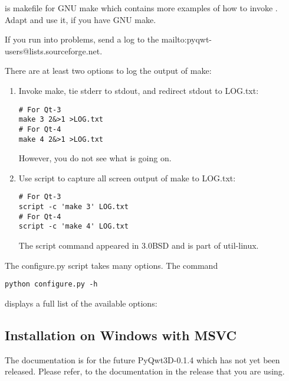 \documentclass{manual}
\makeatletter
\newcommand{\mailinglist}{\ulink{mailing list}
  {mailto:pyqwt-users@lists.sourceforge.net}}
\newcommand{\Future}{
  \begin{notice}[warning]
    The documentation is for the future PyQwt3D-0.1.4 which has not yet been
    released.  Please refer, to the documentation in the release that you are
    using.
  \end{notice}
}
\makeatother
\begin{document}
\begin{notice}[note]
   is makefile for GNU make which contains more
  examples of how to invoke .
  Adapt and use it, if you have GNU make.
\end{notice}

\begin{notice}[note]
  If you run into problems, send a log to the \mailinglist{}.

  There are at least two options to log the output of make:
  \begin{enumerate}
  \item Invoke make, tie stderr to stdout, and redirect stdout to LOG.txt:
\begin{verbatim}
# For Qt-3
make 3 2&>1 >LOG.txt
# For Qt-4
make 4 2&>1 >LOG.txt
\end{verbatim}
    However, you do not see what is going on.
  \item Use script to capture all screen output of make to LOG.txt:
\begin{verbatim}
# For Qt-3
script -c 'make 3' LOG.txt
# For Qt-4
script -c 'make 4' LOG.txt
\end{verbatim}
    The script command appeared in 3.0BSD and is part of util-linux.
  \end{enumerate}
\end{notice}

\begin{notice}[note]
  The configure.py script takes many options. The command
\begin{verbatim}
python configure.py -h
\end{verbatim}
  displays a full list of the available options:
  
\end{notice}


\subsection{Installation on Windows with MSVC\label{win-install}}

\Future{}
\end{document}

